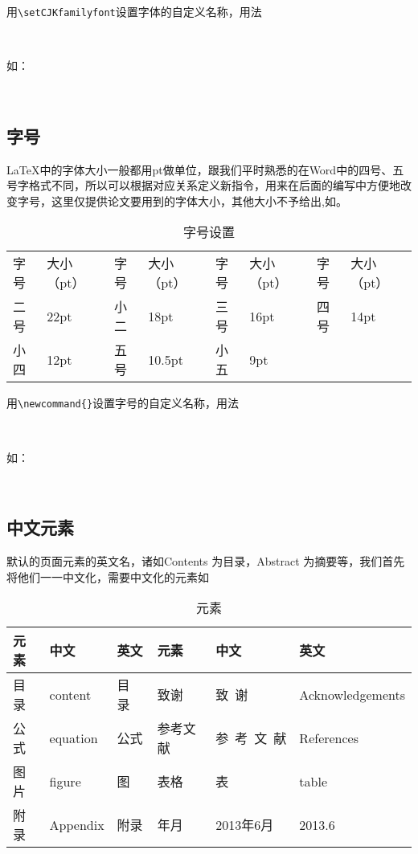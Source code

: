 用\verb|\setCJKfamilyfont|设置字体的自定义名称，用法

{\\}

如：

{\\}

\subsection{字号}
\label{sec:fontsize}
\LaTeX{}中的字体大小一般都用pt做单位，跟我们平时熟悉的在Word中的四号、五号字格式不同，所以可以根据对应关系定义新指令，用来在后面的编写中方便地改变字号，这里仅提供论文要用到的字体大小，其他大小不予给出,如。
\begin{table}[hbpt]
\begin{center}
\caption{字号设置}
\label{tab:fontsize}
\begin{tabularx}{\linewidth}{ZZZZZZZZ}\toprule
字号 & 大小（pt）& 字号 & 大小（pt）& 字号 & 大小（pt）& 字号 & 大小（pt）\\
二号 & 22pt & 小二 & 18pt & 三号 & 16pt & 四号 & 14pt \\
小四 & 12pt & 五号 & 10.5pt & 小五 & 9pt & & \\\bottomrule
\end{tabularx}
\end{center}
\end{table}

用\verb|\newcommand{}|设置字号的自定义名称，用法

{\centering {\verb|\newcommand{命令}{\fontsize{大小}{行距}\selectfont}|}\\}

如：

{\centering {\verb|\newcommand{erhao}{\fontsize{22pt}{\baselineskip}\selectfont}|}\\}

\subsection{中文元素}
默认的页面元素的英文名，诸如Contents 为目录，Abstract 为摘要等，我们首先将他们一一中文化，需要中文化的元素如
\begin{table}[htbp]
\begin{center}
\caption{元素}
\label{tab:element}
\begin{tabularx}{\linewidth}{ZZZZZZ}\toprule
元素 & 中文 & 英文 & 元素 & 中文 & 英文 \\\midrule
目录 & content & 目 录 & 致谢 & 致~谢 & Acknowledgements \\
公式 & equation & 公式 & 参考文献 & 参~考~文~献 & References \\
图片 & figure & 图 & 表格 & 表 & table\\
附录 & Appendix & 附录 & 年月 & 2013年6月 & 2013.6 \\\bottomrule
\end{tabularx}
\end{center}
\end{table}

